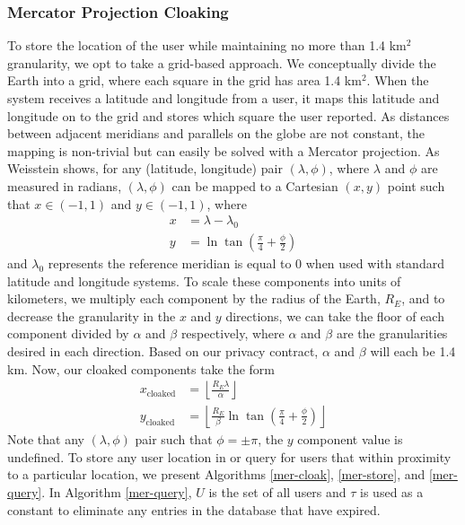 \subsubsection{Mercator Projection Cloaking}

To store the location of the user while maintaining no more than 1.4 km$^2$ granularity, we opt to take a grid-based approach. We conceptually divide the Earth into a grid, where each square in the grid has area 1.4 km$^2$. When the system receives a latitude and longitude from a user, it maps this latitude and longitude on to the grid and stores which square the user reported. As distances between adjacent meridians and parallels on the globe are not constant, the mapping is non-trivial but can easily be solved with a Mercator projection. As Weisstein \cite{mercator} shows, for any (latitude, longitude) pair $(\lambda, \phi)$, where $\lambda$ and $\phi$ are measured in radians, $(\lambda, \phi)$ can be mapped to a Cartesian $(x, y)$ point such that $x \in (-1, 1)$ and $y \in (-1, 1)$, where
\begin{align*}
    x &= \lambda - \lambda_0\\
    y &= \ln \tan \left(\frac{\pi}{4} + \frac{\phi}{2} \right)
\end{align*}
and $\lambda_0$ represents the reference meridian is equal to 0 when used with standard latitude and longitude systems. To scale these components into units of kilometers, we multiply each component by the radius of the Earth, $R_E$, and to decrease the granularity in the $x$ and $y$ directions, we can take the floor of each component divided by $\alpha$ and $\beta$ respectively, where $\alpha$ and $\beta$ are the granularities desired in each direction. Based on our privacy contract, $\alpha$ and $\beta$ will each be 1.4 km. Now, our cloaked components take the form
\begin{align*}
    x_{\text{cloaked}} &= \left\lfloor \frac{R_E\lambda}{\alpha} \right\rfloor \\
    y_{\text{cloaked}} &= \left\lfloor \frac{R_E}{\beta} \ln \tan\left( \frac{\pi}{4} + \frac{\phi}{2} \right) \right\rfloor
\end{align*}
Note that any $(\lambda, \phi)$ pair such that $\phi = \pm\pi$, the $y$ component value is undefined. To store any user location in or query for users that within proximity to a particular location, we present Algorithms \ref{mer-cloak}, \ref{mer-store}, and \ref{mer-query}. In Algorithm \ref{mer-query}, $U$ is the set of all users and $\tau$ is used as a constant to eliminate any entries in the database that have expired.

